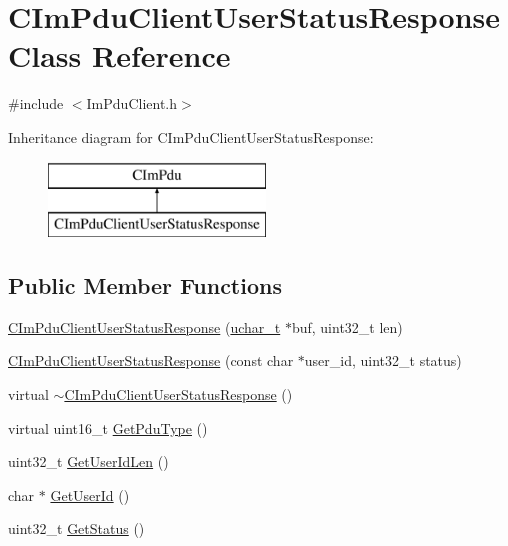 \hypertarget{class_c_im_pdu_client_user_status_response}{}\section{C\+Im\+Pdu\+Client\+User\+Status\+Response Class Reference}
\label{class_c_im_pdu_client_user_status_response}


{\ttfamily \#include $<$Im\+Pdu\+Client.\+h$>$}

Inheritance diagram for C\+Im\+Pdu\+Client\+User\+Status\+Response\+:\begin{figure}[H]
\begin{center}
\leavevmode
\includegraphics[height=2.000000cm]{class_c_im_pdu_client_user_status_response}
\end{center}
\end{figure}
\subsection*{Public Member Functions}
\begin{DoxyCompactItemize}
\item 
\hyperlink{class_c_im_pdu_client_user_status_response_ad639451bdf1debf2f3d80bbb52f45ffe}{C\+Im\+Pdu\+Client\+User\+Status\+Response} (\hyperlink{base_2ostype_8h_a124ea0f8f4a23a0a286b5582137f0b8d}{uchar\+\_\+t} $\ast$buf, uint32\+\_\+t len)
\item 
\hyperlink{class_c_im_pdu_client_user_status_response_a3d96c7dd4517ec0ff38ab1656f542300}{C\+Im\+Pdu\+Client\+User\+Status\+Response} (const char $\ast$user\+\_\+id, uint32\+\_\+t status)
\item 
virtual \hyperlink{class_c_im_pdu_client_user_status_response_a48180211cab24aa1c7badf7c8fd1be85}{$\sim$\+C\+Im\+Pdu\+Client\+User\+Status\+Response} ()
\item 
virtual uint16\+\_\+t \hyperlink{class_c_im_pdu_client_user_status_response_a946ad65828176c9b9b70fa65513ac732}{Get\+Pdu\+Type} ()
\item 
uint32\+\_\+t \hyperlink{class_c_im_pdu_client_user_status_response_a828edf88de4f81cc4ae436f853e87657}{Get\+User\+Id\+Len} ()
\item 
char $\ast$ \hyperlink{class_c_im_pdu_client_user_status_response_a9417b272bde796471773f09aa9e001cf}{Get\+User\+Id} ()
\item 
uint32\+\_\+t \hyperlink{class_c_im_pdu_client_user_status_response_a25a36092b251ee404dd200f1dc9b28fd}{Get\+Status} ()
\end{DoxyCompactItemize}
